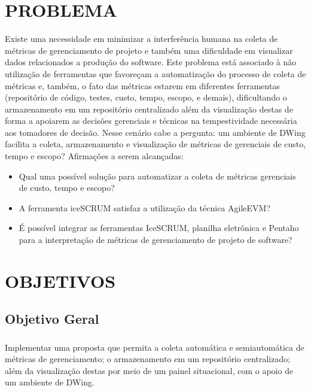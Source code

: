 \section{PROBLEMA}
Existe uma necessidade em minimizar a interferência humana na coleta de métricas de gerenciamento de projeto e também uma dificuldade em visualizar dados relacionados a produção do software. Este problema está associado à não utilização de ferramentas que favoreçam a automatização do processo de coleta de métricas e, também, o fato das métricas estarem em diferentes ferramentas (repositório de código, testes, custo, tempo, escopo, e demais), dificultando o armazenamento em um repositório centralizado além da visualização destas de forma a apoiarem as decisões gerenciais e técnicas na tempestividade necessária aos tomadores de decisão.
Nesse cenário cabe a pergunta: um ambiente de DWing facilita a coleta, armazenamento e visualização de métricas de gerenciais de custo, tempo e escopo? 
Afirmações a serem alcançadas:
\begin{itemize}
	\item Qual uma possível solução para automatizar a coleta de métricas gerenciais de custo, tempo e escopo?
	\item A ferramenta iceSCRUM satisfaz a utilização da técnica AgileEVM?
	\item É possível integrar as ferramentas IceSCRUM, planilha eletrônica e Pentaho para a interpretação de métricas de gerenciamento de projeto de software?
\end{itemize}





\section{OBJETIVOS}

\subsection{Objetivo Geral}

\subsubsection{}
Implementar uma proposta que permita a coleta automática e semiautomática de métricas de gerenciamento; o armazenamento em um repositório centralizado; além da visualização destas por meio de um painel situacional, com o apoio de um ambiente de DWing.

